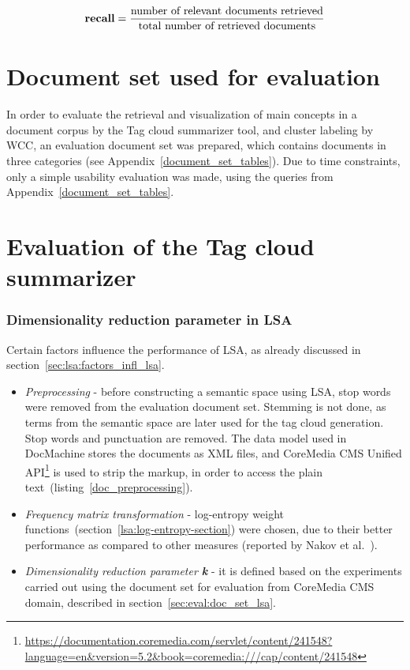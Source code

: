 \begin{equation}
\mbox{\textbf{recall}} = \frac{\mbox{number of relevant documents retrieved}} {\mbox{total number of retrieved documents}}
\end{equation}

\section{Document set used for evaluation}
In order to evaluate the retrieval and visualization of main concepts in a document corpus by the Tag cloud summarizer tool, and cluster labeling by \gls{WCC}, an evaluation document set was prepared, which contains documents in three categories (see Appendix~\ref{document_set_tables}). Due to time constraints, only a simple usability evaluation was made, using the queries from Appendix~\ref{document_set_tables}.


\section{Evaluation of the Tag cloud summarizer}

\subsubsection{Dimensionality reduction parameter in LSA}
Certain factors influence the performance of LSA, as already discussed in section~\ref{sec:lsa:factors_infl_lsa}. 
\begin{itemize}
\item \textit{Preprocessing} - before constructing a semantic space using \gls{LSA}, stop words were removed from the evaluation document set. Stemming is not done, as terms from the semantic space are later used for the tag cloud generation.
Stop words and punctuation are removed. The data model used in DocMachine stores the documents as XML files, and CoreMedia \gls{CMS} Unified API\footnote{\url{https://documentation.coremedia.com/servlet/content/241548?language=en&version=5.2&book=coremedia:///cap/content/241548}} is used to strip the markup, in order to access the plain text~(listing~\ref{doc_preprocessing}). \\

\item \textit{Frequency matrix transformation} - log-entropy weight functions~(section~\ref{lsa:log-entropy-section}) were chosen, due to their better performance as compared to other measures (reported by Nakov et al.~\cite{Nakov_weightfunctions}).
\item \textit{Dimensionality reduction parameter \textbf{k}} - it is defined based on the experiments carried out using the document set for evaluation from CoreMedia \gls{CMS} domain, described in section~\ref{sec:eval:doc_set_lsa}. 

\end{itemize}


